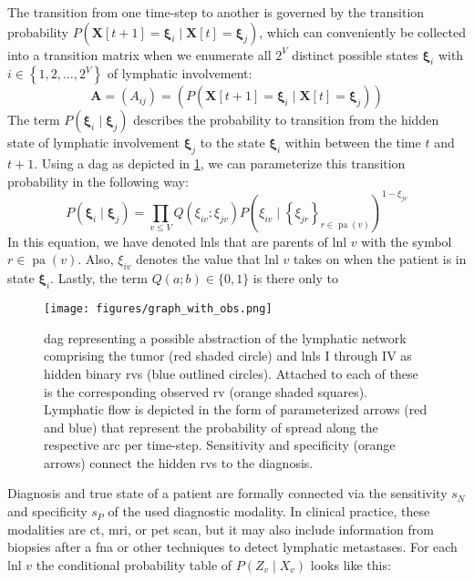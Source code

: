 \documentclass[twocolumn]{aastex631}
\begin{document}
The transition from one time-step to another is governed by the transition probability $P\left( \mathbf{X}[t+1]=\boldsymbol{\xi}_i \mid \mathbf{X}[t]=\boldsymbol{\xi}_j \right)$, which can conveniently be collected into a transition matrix when we enumerate all $2^V$ distinct possible states $\boldsymbol{\xi}_i$ with $i \in \left\{ 1,2, \ldots, 2^V \right\}$ of lymphatic involvement:
%
\begin{equation}
    \mathbf{A} = \left( A_{ij} \right) = \left( P\left( \mathbf{X}[t+1]=\boldsymbol{\xi}_i \mid \mathbf{X}[t]=\boldsymbol{\xi}_j \right) \right)
\end{equation}
%
The term $P\left( \boldsymbol{\xi}_i \mid \boldsymbol{\xi}_j \right)$ describes the probability to transition from the hidden state of lymphatic involvement $\boldsymbol{\xi}_j$ to the state $\boldsymbol{\xi}_i$ within between the time $t$ and $t+1$. Using a \gls{dag} as depicted in \cref{fig:graph_with_obs}, we can parameterize this transition probability in the following way:
%
\begin{equation}
    \label{eq:transition_prob}
    P\left( \boldsymbol{\xi}_i \mid \boldsymbol{\xi}_j \right) = \prod_{v \leq V} Q\left( \xi_{iv} ; \xi_{jv} \right) P \left( \xi_{iv} \mid \left\{ \xi_{jr} \right\}_{r \in \operatorname{pa}(v)} \right)^{1 - \xi_{jv}}
\end{equation}
%
In this equation, we have denoted \glspl{lnl} that are parents of \gls{lnl} $v$ with the symbol $r\in\operatorname{pa}(v)$. Also, $\xi_{iv}$ denotes the value that \gls{lnl} $v$ takes on when the patient is in state $\boldsymbol{\xi}_i$. Lastly, the term $Q(a;b) \in \{ 0,1 \}$ is there only to 

\begin{figure}
    \centering
    \texttt{[image: figures/graph\_with\_obs.png]}
    \caption{\Gls{dag} representing a possible abstraction of the lymphatic network comprising the tumor (red shaded circle) and \glspl{lnl} I through IV as hidden binary \glspl{rv} (blue outlined circles). Attached to each of these is the corresponding observed \gls{rv} (orange shaded squares). Lymphatic flow is depicted in the form of parameterized arrows (red and blue) that represent the probability of spread along the respective arc per time-step. Sensitivity and specificity (orange arrows) connect the hidden \glspl{rv} to the diagnosis.}
    \label{fig:graph_with_obs}
\end{figure}

Diagnosis and true state of a patient are formally connected via the sensitivity $s_N$ and specificity $s_P$ of the used diagnostic modality. In clinical practice, these modalities are \gls{ct}, \gls{mri}, or \gls{pet} scan, but it may also include information from biopsies after a \gls{fna} or other techniques to detect lymphatic metastases. For each \gls{lnl} $v$ the conditional probability table of $P\left( Z_v \mid X_v \right)$ looks like this:
\end{document}
